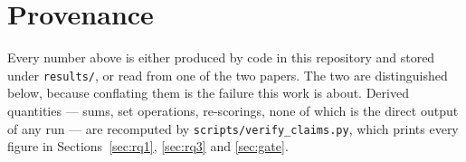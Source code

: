 \section{Provenance}
\label{sec:provenance}

Every number above is either produced by code in this repository and stored under
\texttt{results/}, or read from one of the two papers. The two are distinguished
below, because conflating them is the failure this work is about. Derived
quantities --- sums, set operations, re-scorings, none of which is the direct
output of any run --- are recomputed by \texttt{scripts/verify\_claims.py}, which
prints every figure in Sections~\ref{sec:rq1}, \ref{sec:rq3} and \ref{sec:gate}.

